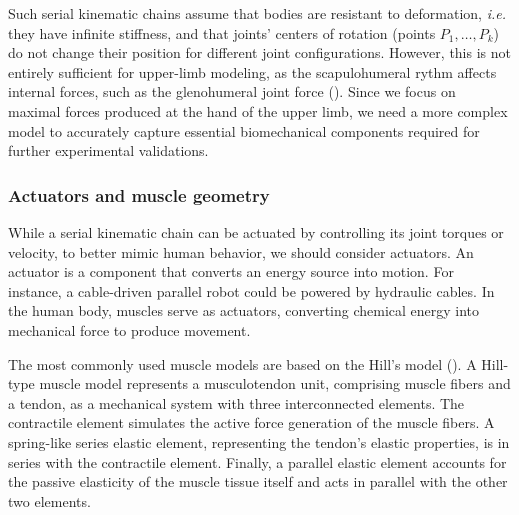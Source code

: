 Such serial kinematic chains assume that bodies are resistant to deformation, \emph{i.e.} they have infinite stiffness, and that joints' centers of rotation (points $P_1, \dots, P_k$) do not change their position for different joint configurations. However, this is not entirely sufficient for upper-limb modeling, as the scapulohumeral rythm affects internal forces, such as the glenohumeral joint force (\cite{flores-hernandezScapulothoracicRhythmAffects2019}). Since we focus on maximal forces produced at the hand of the upper limb, we need a more complex model to accurately capture essential biomechanical components required for further experimental validations. 

\subsubsection*{Actuators and muscle geometry}
While a serial kinematic chain can be actuated by controlling its joint torques or velocity, to better mimic human behavior, we should consider actuators. An actuator is a component that converts an energy source into motion. For instance, a cable-driven parallel robot could be powered by hydraulic cables. In the human body, muscles serve as actuators, converting chemical energy into mechanical force to produce movement.

The most commonly used muscle models are based on the Hill's model (\cite{hillHeatShorteningDynamic1938}). A Hill-type muscle model represents a musculotendon unit, comprising muscle fibers and a tendon, as a mechanical system with three interconnected elements. The contractile element simulates the active force generation of the muscle fibers.  A spring-like series elastic element, representing the tendon's elastic properties, is in series with the contractile element. Finally, a parallel elastic element accounts for the passive elasticity of the muscle tissue itself and acts in parallel with the other two elements. 

